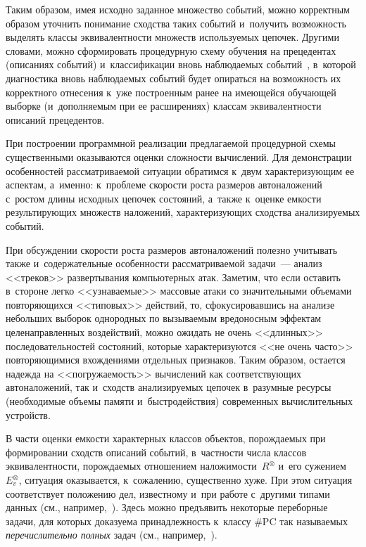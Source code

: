\begin{multicols}{2}
  \smallskip
  
  Таким образом, имея исходно заданное множество событий, можно 
корректным образом уточнить понимание сходства таких событий и~получить\linebreak 
воз\-мож\-ность выделять классы эк\-ви\-ва\-лент\-ности множеств используемых 
цепочек. Другими словами, можно сформировать процедурную схему обуче\-ния 
на прецедентах (описаниях событий) и~классификации вновь наблю\-да\-емых 
событий~\cite{6-gr}, в~которой диа\-гнос\-ти\-ка вновь наблюдаемых событий будет 
опираться на возможность их корректного отнесения к~уже построенным ранее 
на име\-ющей\-ся обуча\-ющей выборке (и~дополняемым при ее расширениях) 
классам эк\-ви\-ва\-лент\-ности описаний прецедентов.
  
  При построении программной реализации предлагаемой процедурной схемы 
существенными оказываются оценки слож\-ности вы\-чис\-ле\-ний. Для демонстрации 
особенностей рассматриваемой ситуации обратимся к~двум ха\-рак\-те\-ри\-зу\-ющим ее 
аспектам, а~именно: к~проб\-ле\-ме ско\-рости рос\-та размеров автоналожений с~рос\-том 
длины исходных цепочек со\-сто\-яний, а~так\-же к~оценке ем\-кости ре\-зуль\-ти\-ру\-ющих 
мно\-жеств наложений, ха\-рак\-те\-ри\-зу\-ющих сходства ана\-ли\-зи\-ру\-емых событий.
  
  При обсуждении скорости роста размеров автоналожений полезно учитывать 
также и~содержа\-тельные особенности рас\-смат\-ри\-ва\-емой задачи~--- анализ 
<<треков>> развертывания компьютерных атак. Заметим, что если оста\-вить 
в~стороне легко <<узнаваемые>> массовые атаки со значительными объемами 
по\-вто\-ря\-ющих\-ся <<типовых>> действий, то, сфокусировавшись на анализе 
небольших выборок однородных по вызываемым вредоносным эффектам 
целенаправленных воз\-дей\-ст\-вий, мож\-но ожидать не очень <<длинных>> 
последовательностей со\-сто\-яний, которые характеризуются <<не очень час\-то>> 
повторяющимися вхождениями отдельных признаков. Таким образом, остается 
надежда на <<по\-гру\-жа\-емость>> вы\-чис\-ле\-ний как со\-от\-вет\-ст\-ву\-ющих 
автоналожений, так и~сходств ана\-ли\-зи\-ру\-емых цепочек в~разумные ресурсы 
(необходимые объемы памяти и~быст\-ро\-дей\-ст\-вия) современных вы\-чис\-ли\-тель\-ных 
устройств.
  
  В части оценки емкости характерных классов объектов, порождаемых при 
формировании сходств описаний событий, в~част\-ности чис\-ла классов 
экви\-ва\-лент\-ности, по\-рож\-да\-емых отношением на\-ло\-жи\-мости~$R^\otimes$ и~его 
суже\-ни\-ем~$E_v^\otimes$, ситуация оказывается, к~сожалению, существенно 
хуже. При этом ситуация со\-от\-вет\-ст\-ву\-ет положению дел, известному и~при 
работе с~другими типами данных (см., например,~\cite{7-gr}). Здесь можно 
предъявить некоторые переборные задачи, для которых доказуема 
при\-над\-леж\-ность к~классу $\#\mathrm{PC}$ так на\-зы\-ва\-емых \textit{перечислительно 
полных} задач (см., например,~\cite{8-gr, 9-gr, 10-gr, 11-gr}).
  

\end{multicols}
